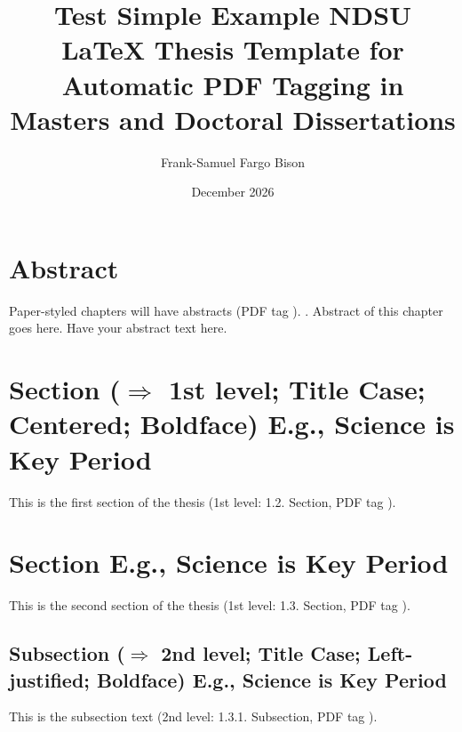 \documentclass[ms-thesis,mathdesign,chpterrefs,showgrid]{ndsu-thesis-tagged}%
\title{Test Simple Example NDSU LaTeX Thesis Template for Automatic PDF Tagging in Masters and Doctoral Dissertations}
\author{Frank-Samuel Fargo Bison}
\date{December 2026}
\begin{document}


\checkBeginRefsection%

\noindent\start {}

\section{Abstract}
Paper-styled chapters will have abstracts (PDF tag ). . Abstract of this chapter goes here. Have your abstract text here. \repText[10]

\section{Section ($\Rightarrow$ 1st level; Title Case; Centered; Boldface) E.g., Science is Key Period}
This is the first section of the thesis (1st level: 1.2. Section, PDF tag ). \repInText

\section{Section E.g., Science is Key Period}
This is the second section of the thesis (1st level: 1.3. Section, PDF tag ). \repText[18]

\subsection{Subsection ($\Rightarrow$ 2nd level; Title Case; Left-justified; Boldface) E.g., Science is Key Period}
This is the subsection text (2nd level: 1.3.1. Subsection, PDF tag ). 
\end{document}
